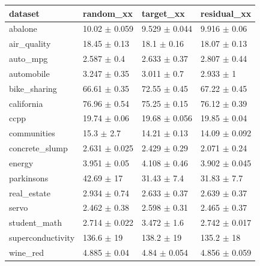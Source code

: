 \begin{tabular}{llll}
\toprule
dataset & random\_xx & target\_xx & residual\_xx \\
\midrule
abalone & 10.02 $\pm$ 0.059 & 9.529 $\pm$ 0.044 & 9.916 $\pm$ 0.06 \\
air\_quality & 18.45 $\pm$ 0.13 & 18.1 $\pm$ 0.16 & 18.07 $\pm$ 0.13 \\
auto\_mpg & 2.587 $\pm$ 0.4 & 2.633 $\pm$ 0.37 & 2.807 $\pm$ 0.44 \\
automobile & 3.247 $\pm$ 0.35 & 3.011 $\pm$ 0.7 & 2.933 $\pm$ 1 \\
bike\_sharing & 66.61 $\pm$ 0.35 & 72.55 $\pm$ 0.45 & 67.22 $\pm$ 0.45 \\
california & 76.96 $\pm$ 0.54 & 75.25 $\pm$ 0.15 & 76.12 $\pm$ 0.39 \\
ccpp & 19.74 $\pm$ 0.06 & 19.68 $\pm$ 0.056 & 19.85 $\pm$ 0.04 \\
communities & 15.3 $\pm$ 2.7 & 14.21 $\pm$ 0.13 & 14.09 $\pm$ 0.092 \\
concrete\_slump & 2.631 $\pm$ 0.025 & 2.429 $\pm$ 0.29 & 2.071 $\pm$ 0.24 \\
energy & 3.951 $\pm$ 0.05 & 4.108 $\pm$ 0.46 & 3.902 $\pm$ 0.045 \\
parkinsons & 42.69 $\pm$ 17 & 31.43 $\pm$ 7.4 & 31.83 $\pm$ 7.7 \\
real\_estate & 2.934 $\pm$ 0.74 & 2.633 $\pm$ 0.37 & 2.639 $\pm$ 0.37 \\
servo & 2.462 $\pm$ 0.38 & 2.598 $\pm$ 0.31 & 2.465 $\pm$ 0.37 \\
student\_math & 2.714 $\pm$ 0.022 & 3.472 $\pm$ 1.6 & 2.742 $\pm$ 0.017 \\
superconductivity & 136.6 $\pm$ 19 & 138.2 $\pm$ 19 & 135.2 $\pm$ 18 \\
wine\_red & 4.885 $\pm$ 0.04 & 4.84 $\pm$ 0.054 & 4.856 $\pm$ 0.059 \\
\bottomrule
\end{tabular}
